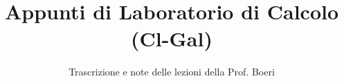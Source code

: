 \documentclass[a4paper,12pt]{article}
\title{Appunti di Laboratorio di Calcolo (Cl-Gal)}
\author{Trascrizione e note delle lezioni della Prof. Boeri}
\date{}
\begin{document}
\maketitle
\projectintro
\tableofcontents
\newpage

\end{document}
